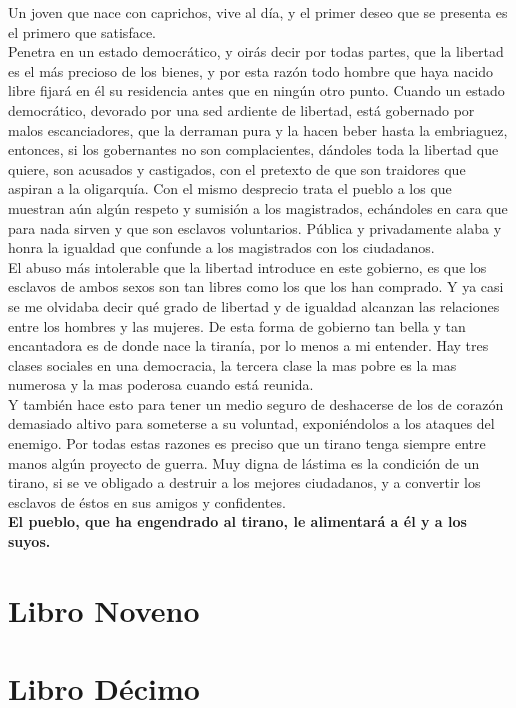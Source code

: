 \documentclass[10pt]{book}
\begin{document}
Un joven que nace con caprichos, vive al día, y el primer deseo que se presenta es el primero que satisface.\\
Penetra en un estado democrático, y oirás decir por todas partes, que la libertad es el más precioso de los bienes, y por esta razón todo hombre que haya nacido libre fijará en él su residencia antes que en ningún otro punto. Cuando un estado democrático, devorado por una sed ardiente de libertad, está gobernado por malos escanciadores, que la derraman pura y la hacen beber hasta la embriaguez, entonces, si los gobernantes no son complacientes, dándoles toda la libertad que quiere, son acusados y castigados, con el pretexto de que son traidores que aspiran a la oligarquía. Con el mismo desprecio trata el pueblo a los que muestran aún algún respeto y sumisión a los magistrados, echándoles en cara que para nada sirven y que son esclavos voluntarios. Pública y privadamente alaba y honra la igualdad que confunde a los magistrados con los ciudadanos.\\ 
El abuso más intolerable que la libertad introduce en este gobierno, es que los esclavos de ambos sexos son tan libres como los que los han comprado. Y ya casi se me olvidaba decir qué grado de libertad y de igualdad alcanzan las relaciones entre los hombres y las mujeres. De esta forma de gobierno tan bella y tan encantadora es de donde nace la tiranía, por lo menos a mi entender. Hay tres clases sociales en una democracia, la tercera clase la mas pobre es la mas numerosa y la mas poderosa cuando está reunida.\\
Y también hace esto para tener un medio seguro de deshacerse de los de corazón demasiado altivo para someterse a su voluntad, exponiéndolos a los ataques del enemigo. Por todas estas razones es preciso que un tirano tenga siempre entre manos algún proyecto de guerra. Muy digna de lástima es la condición de un tirano, si se ve obligado a destruir a los mejores ciudadanos, y a convertir los esclavos de éstos en sus amigos y confidentes. \\
\textbf{El pueblo, que ha engendrado al tirano, le alimentará a él y a los suyos.} 

\chapter*{Libro Noveno}


\chapter*{Libro Décimo}
 
\end{document}
